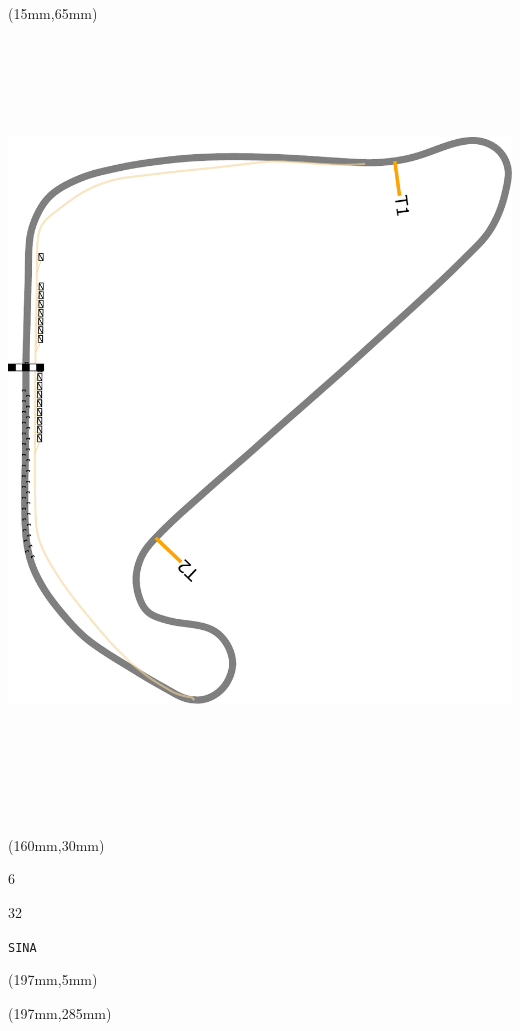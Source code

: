 \begin{textblock*}{185mm}(15mm,65mm)%
\centering
\mbox{\includegraphics[width=185mm,height=210mm,keepaspectratio]{PT/SINA.pdf}}
\end{textblock*}
\begin{textblock*}{40mm}(160mm,30mm)%
\Large
\par{} 
\par6 
\par32 
\par\hfill\tiny\tt SINA\\
\end{textblock*}
\begin{textblock*}{20mm}(197mm,5mm)%
\fbox{\thepage}
\label{SINA}
\end{textblock*}
\begin{textblock*}{20mm}(197mm,285mm)%
\fbox{\thepage}
\end{textblock*}

